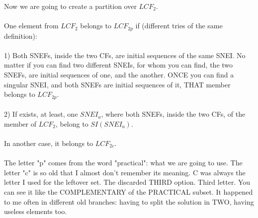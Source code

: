 		\noindent
		Now we are going to create a partition over $LCF_{2}$.
		\\\\
		
		\noindent
		One element from $LCF_{2}$ belongs to $LCF_{2p}$ if (different tries of the same definition):\\\\
		1) Both SNEFs, inside the two CFs, are initial sequences of the same SNEI. No matter if you can find two different SNEIs, for whom you can find, the two SNEFs, are initial sequences of one, and the another. ONCE you can find a singular SNEI, and both SNEFs are initial sequences of it, THAT member belongs to $LCF_{2p}$.\\\\
		2) If exists, at least, one $SNEI_{a}$, where both SNEFs, inside the two CFs, of the member of $LCF_{2}$, belong to $SI(SNEI_{a})$.
		\\\\
		
		\noindent
		In another case, it belongs to $LCF_{2c}$.
		\\\\
		
		\noindent
		The letter "p" comes from the word "practical": what we are going to use. The letter "c" is so old that I almost don't remember its meaning. C was always the letter I used for the leftover set. The discarded THIRD option. Third letter. You can see it like the COMPLEMENTARY of the PRACTICAL subset. It happened to me often in different old branches: having to split the solution in TWO, having useless elements too.
		\\\\
		
